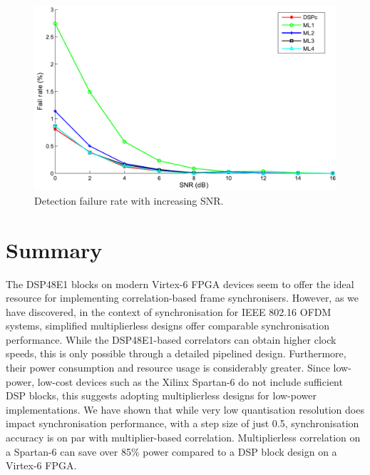 \begin{figure}
	\centerline{\includegraphics [width=0.9\columnwidth] {figures/Plot_NFail.pdf} }
	\caption{Detection failure rate with increasing SNR.}
	\label{fig:Plot_NFail}
\end{figure}

\section{Summary}
The DSP48E1 blocks on modern Virtex-6 FPGA devices seem to offer the ideal resource for implementing correlation-based frame synchronisers.
However, as we have discovered, in the context of synchronisation for IEEE 802.16 OFDM systems, simplified multiplierless designs offer comparable synchronisation performance.
While the DSP48E1-based correlators can obtain higher clock speeds, this is only possible through a detailed pipelined design.
Furthermore, their power consumption and resource usage is considerably greater.
Since low-power, low-cost devices such as the Xilinx Spartan-6 do not include sufficient DSP blocks, this suggests adopting multiplierless designs for low-power implementations.
We have shown that while very low quantisation resolution does impact synchronisation performance, with a step size of just 0.5, synchronisation accuracy is on par with multiplier-based correlation.
Multiplierless correlation on a Spartan-6 can save over 85\% power compared to a DSP block design on a Virtex-6 FPGA.